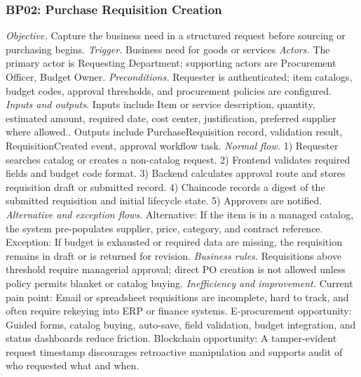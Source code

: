 \documentclass[conference]{IEEEtran}
\begin{document}
\subsubsection{BP02: Purchase Requisition Creation}
\textit{Objective.} Capture the business need in a structured request before sourcing or purchasing begins.
\textit{Trigger.} Business need for goods or services
\textit{Actors.} The primary actor is Requesting Department; supporting actors are Procurement Officer, Budget Owner.
\textit{Preconditions.} Requester is authenticated; item catalogs, budget codes, approval thresholds, and procurement policies are configured.
\textit{Inputs and outputs.} Inputs include Item or service description, quantity, estimated amount, required date, cost center, justification, preferred supplier where allowed.. Outputs include PurchaseRequisition record, validation result, RequisitionCreated event, approval workflow task.
\textit{Normal flow.} 1) Requester searches catalog or creates a non-catalog request. 2) Frontend validates required fields and budget code format. 3) Backend calculates approval route and stores requisition draft or submitted record. 4) Chaincode records a digest of the submitted requisition and initial lifecycle state. 5) Approvers are notified.
\textit{Alternative and exception flows.} Alternative: If the item is in a managed catalog, the system pre-populates supplier, price, category, and contract reference. Exception: If budget is exhausted or required data are missing, the requisition remains in draft or is returned for revision.
\textit{Business rules.} Requisitions above threshold require managerial approval; direct PO creation is not allowed unless policy permits blanket or catalog buying.
\textit{Inefficiency and improvement.} Current pain point: Email or spreadsheet requisitions are incomplete, hard to track, and often require rekeying into ERP or finance systems. E-procurement opportunity: Guided forms, catalog buying, auto-save, field validation, budget integration, and status dashboards reduce friction. Blockchain opportunity: A tamper-evident request timestamp discourages retroactive manipulation and supports audit of who requested what and when.
\end{document}
